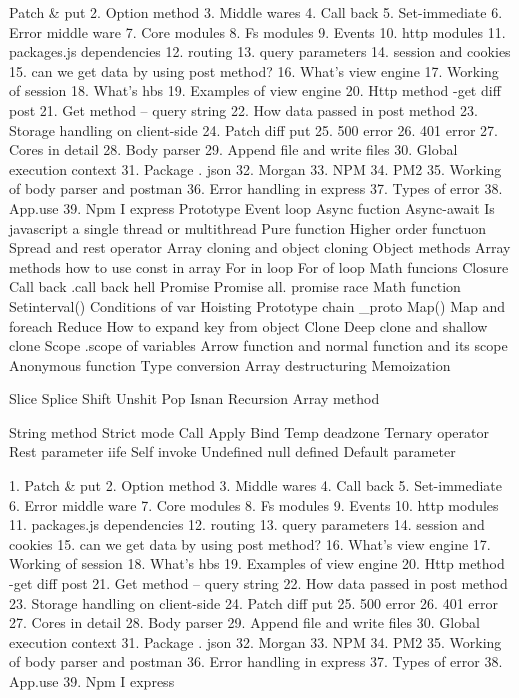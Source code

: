 Patch & put 
2.	Option method 
3.	Middle wares
4.	Call back
5.	 Set-immediate
6.	Error middle ware 
7.	Core modules 
8.	Fs modules 
9.	Events
10.	http modules
11.	packages.js dependencies
12.	routing
13.	query parameters
14.	session and cookies
15.	can we get data by using post method?
16.	What’s view engine
17.	Working of session
18.	What’s hbs
19.	Examples of view engine
20.	Http method -get diff post 
21.	Get method – query string
22.	How data passed in post method
23.	Storage handling on client-side
24.	Patch diff put 
25.	500 error
26.	401 error
27.	Cores in detail
28.	Body parser
29.	Append file and write files
30.	Global execution context
31.	Package . json
32.	Morgan
33.	NPM 
34.	PM2 
35.	Working of body parser and postman
36.	Error handling in express
37.	Types of error 
38.	App.use
39.	Npm I express
Prototype
Event loop
Async fuction
Async-await
Is javascript a single thread or multithread
Pure function
Higher order functuon
Spread and rest operator
Array cloning  and object cloning
Object methods
Array methods
 how to use const in array
For in loop
For of loop
Math funcions
Closure
Call back
.call back hell
Promise
Promise all.
promise race
Math function
Setinterval()
Conditions of var
Hoisting
Prototype chain
_proto
Map()
Map and foreach
Reduce
How to expand key from object
Clone
Deep clone and shallow clone
Scope
.scope of variables
Arrow function and normal function and its scope
Anonymous function 
Type conversion
Array destructuring
Memoization

Slice 
Splice
Shift
Unshit
Pop
Isnan
Recursion
Array method 

String method
Strict mode
Call 
Apply
Bind
Temp deadzone
Ternary operator
Rest parameter
iife
Self invoke
Undefined null defined
Default parameter


 1.	Patch & put 
2.	Option method 
3.	Middle wares
4.	Call back
5.	 Set-immediate
6.	Error middle ware 
7.	Core modules 
8.	Fs modules 
9.	Events
10.	http modules
11.	packages.js dependencies
12.	routing
13.	query parameters
14.	session and cookies
15.	can we get data by using post method?
16.	What’s view engine
17.	Working of session
18.	What’s hbs
19.	Examples of view engine
20.	Http method -get diff post 
21.	Get method – query string
22.	How data passed in post method
23.	Storage handling on client-side
24.	Patch diff put 
25.	500 error
26.	401 error
27.	Cores in detail
28.	Body parser
29.	Append file and write files
30.	Global execution context
31.	Package . json
32.	Morgan
33.	NPM 
34.	PM2 
35.	Working of body parser and postman
36.	Error handling in express
37.	Types of error 
38.	App.use
39.	Npm I express

